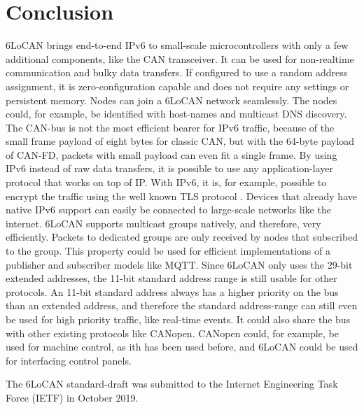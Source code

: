 \chapter{Conclusion}
\label{cha:conclusion}

6LoCAN brings end-to-end IPv6 to small-scale microcontrollers with only a few additional components, like the CAN transceiver.
It can be used for non-realtime communication and bulky data transfers.
If configured to use a random address assignment, it is zero-configuration capable and does not require any settings or persistent memory.
Nodes can join a 6LoCAN network seamlessly. The nodes could, for example, be identified with host-names and multicast DNS discovery.
The CAN-bus is not the most efficient bearer for IPv6 traffic, because of the small frame payload of eight bytes for classic CAN, but with the 64-byte payload of CAN-FD, packets with small payload can even fit a single frame.
By using IPv6 instead of raw data transfers, it is possible to use any application-layer protocol that works on top of IP.
With IPv6, it is, for example, possible to encrypt the traffic using the well known TLS protocol \cite{rfc8446}.
Devices that already have native IPv6 support can easily be connected to large-scale networks like the internet.
6LoCAN supports multicast groups natively, and therefore, very efficiently.
Packets to dedicated groups are only received by nodes that subscribed to the group.
This property could be used for efficient implementations of a publisher and subscriber models like MQTT.
Since 6LoCAN only uses the 29-bit extended addresses, the 11-bit standard address range is still usable for other protocols.
An 11-bit standard address always has a higher priority on the bus than an extended address, and therefore the standard address-range can still even be used for high priority traffic, like real-time events.
It could also share the bus with other existing protocols like CANopen.
CANopen could, for example, be used for machine control, as ith has been used before, and 6LoCAN could be used for interfacing control panels.

The 6LoCAN standard-draft \cite{wachter-6lo-can-00} was submitted to the Internet Engineering Task Force (IETF) in October 2019.